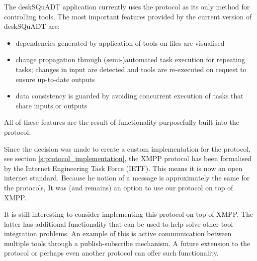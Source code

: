 \documentclass{article}
\begin{document}
   The deskSQuADT application currently uses the protocol as its only method
   for controlling tools. The most important features provided by the current
   version of deskSQuADT are:
    \begin{itemize}
     \item dependencies generated by application of tools on files are
     visualised
     \item change propagation through (semi-)automated task execution for
     repeating tasks; changes in input are detected and tools are re-executed
     on request to ensure up-to-date outputs
     \item data consistency is guarded by avoiding concurrent execution of
     tasks that share inputs or outputs
    \end{itemize}
   All of these features are the result of functionality purposefully built
   into the protocol.

   Since the decision was made to create a custom implementation for the
   protocol, see section \ref{s:protocol_implementation}, the XMPP protocol has
   been formalised by the Internet Engineering Task Force (IETF). This means it
   is now an open internet standard. Because he notion of a message is
   approximately the same for the protocols, It was (and remains) an option to
   use our protocol on top of XMPP.

   It is still interesting to consider implementing this protocol on top of
   XMPP. The latter has additional functionality that can be used to help solve
   other tool integration problems. An example of this is active communication
   between multiple tools through a publish-subscribe mechanism.  A future
   extension to the protocol or perhaps even another protocol can offer such
   functionality.

  \enlargethispage*{4pt}
  
\end{document}
